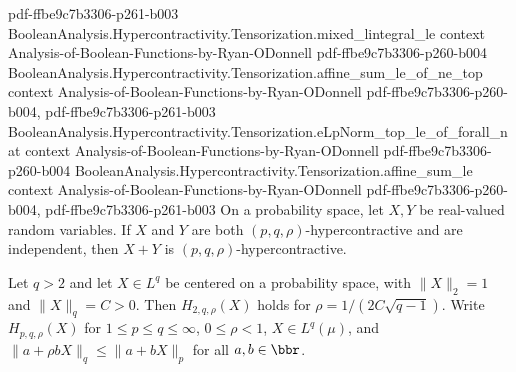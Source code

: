 \begin{theorem}
{    pdf-ffbe9c7b3306-p261-b003}
\proofstep
  {BooleanAnalysis.Hypercontractivity.Tensorization.mixed_lintegral_le}
  {context}
  {Analysis-of-Boolean-Functions-by-Ryan-ODonnell}
  {pdf-ffbe9c7b3306-p260-b004}
\proofstep
  {BooleanAnalysis.Hypercontractivity.Tensorization.affine_sum_le_of_ne_top}
  {context}
  {Analysis-of-Boolean-Functions-by-Ryan-ODonnell}
  {pdf-ffbe9c7b3306-p260-b004,
    pdf-ffbe9c7b3306-p261-b003}
\proofstep
  {BooleanAnalysis.Hypercontractivity.Tensorization.eLpNorm_top_le_of_forall_nat}
  {context}
  {Analysis-of-Boolean-Functions-by-Ryan-ODonnell}
  {pdf-ffbe9c7b3306-p260-b004}
\proofstep
  {BooleanAnalysis.Hypercontractivity.Tensorization.affine_sum_le}
  {context}
  {Analysis-of-Boolean-Functions-by-Ryan-ODonnell}
  {pdf-ffbe9c7b3306-p260-b004,
    pdf-ffbe9c7b3306-p261-b003}
On a probability space, let $X,Y$ be real-valued random variables.
If $X$ and $Y$ are both $(p,q,\rho)$-hypercontractive and are independent, then $X+Y$ is
$(p,q,\rho)$-hypercontractive.
\end{theorem}

\begin{theorem}
\leanok
{}
Let $q>2$ and let $X\in L^q$ be centered on a probability space, with $\|X\|_2=1$ and $\|X\|_q=C>0$. Then $H_{2,q,\rho}(X)$ holds for $\rho=1/(2C\sqrt{q-1})$. Write $H_{p,q,\rho}(X)$ for $1\le p\le q\le\infty$, $0\le\rho<1$, $X\in L^q(\mu)$, and $\|a+\rho bX\|_q\le\|a+bX\|_p$ for all $a,b\in\bbr$.
\end{theorem}

